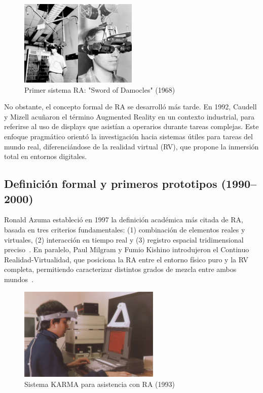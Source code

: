 \begin{figure}[H]
    \centering
    \includegraphics[width=0.5\textwidth]{figs/Sword-of-Damocles.png}
    \caption{Primer sistema RA: "Sword of Damocles" (1968)}
    \label{fig:sword_of_damocles}
\end{figure}

No obstante, el concepto formal de RA se desarrolló más tarde. En 1992, Caudell y Mizell acuñaron el término Augmented Reality en un contexto industrial, para referirse al uso de displays que asistían a operarios durante tareas complejas. Este enfoque pragmático orientó la investigación hacia sistemas útiles para tareas del mundo real, diferenciándose de la realidad virtual (RV), que propone la inmersión total en entornos digitales.

\subsection{Definición formal y primeros prototipos (1990–2000)}
Ronald Azuma estableció en 1997 la definición académica más citada de RA, basada en tres criterios fundamentales: (1) combinación de elementos reales y virtuales, (2) interacción en tiempo real y (3) registro espacial tridimensional preciso~\cite{azuma1997}. En paralelo, Paul Milgram y Fumio Kishino introdujeron el Continuo Realidad-Virtualidad, que posiciona la RA entre el entorno físico puro y la RV completa, permitiendo caracterizar distintos grados de mezcla entre ambos mundos~\cite{billinghurst2015}.

\begin{figure}[H]
    \centering
    \includegraphics[width=0.6\textwidth]{figs/karma.jpg}
    \caption{Sistema KARMA para asistencia con RA (1993)}
    \label{fig:karma}
\end{figure}

